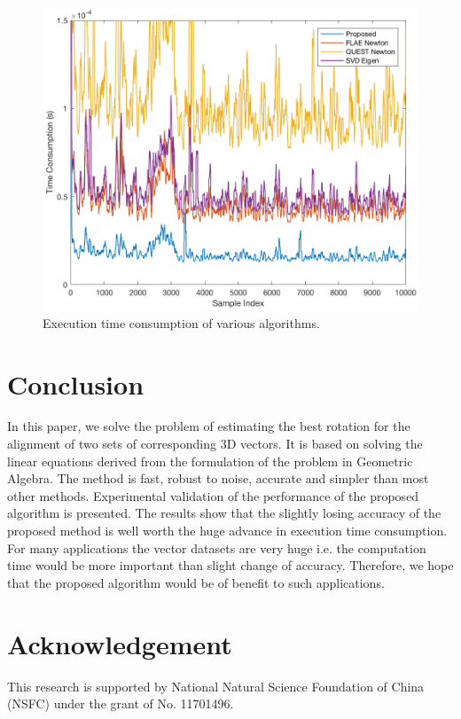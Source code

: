 \documentclass{birkjour}
\numberwithin{equation}{section}
\begin{document}
\begin{figure}[H]
\centering
\includegraphics[width=1.0\textwidth]{time.jpg}
\caption{Execution time consumption of various algorithms.}
\label{fig:time}
\end{figure}

\section{Conclusion}
In this paper, we solve the problem of estimating the best rotation for the alignment of two sets of corresponding 3D vectors. It is based on solving the linear equations derived from the formulation of the problem in Geometric Algebra. The method is fast, robust to noise, accurate and simpler than most other methods. Experimental validation of the performance of the proposed algorithm is presented. The results show that the slightly losing accuracy of the proposed method is well worth the huge advance in execution time consumption. For many applications the vector datasets are very huge i.e. the computation time would be more important than slight change of accuracy. Therefore, we hope that the proposed algorithm would be of benefit to such applications.

\section{Acknowledgement}
This research is supported by National Natural Science Foundation  of China (NSFC) under the grant of No. 11701496.
\end{document}
